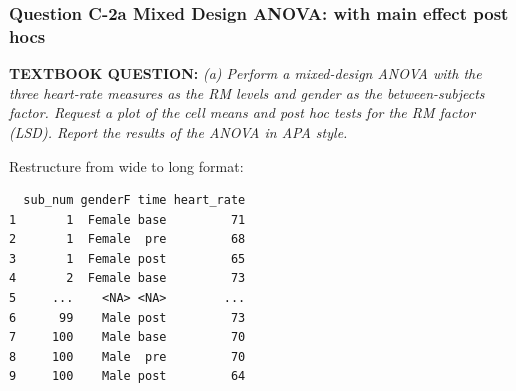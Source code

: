 \documentclass[
]{article}
\newenvironment{Shaded}{\begin{snugshade}}{\end{snugshade}}
\newcommand{\DataTypeTok}[1]{\textcolor[rgb]{0.13,0.29,0.53}{#1}}
\newcommand{\KeywordTok}[1]{\textcolor[rgb]{0.13,0.29,0.53}{\textbf{#1}}}
\newcommand{\NormalTok}[1]{#1}
\newcommand{\OperatorTok}[1]{\textcolor[rgb]{0.81,0.36,0.00}{\textbf{#1}}}
\newcommand{\StringTok}[1]{\textcolor[rgb]{0.31,0.60,0.02}{#1}}
\begin{document}
\hypertarget{question-c-2a-mixed-design-anova-with-main-effect-post-hocs}{%
\subsubsection{Question C-2a Mixed Design ANOVA: with main effect post
hocs}\label{question-c-2a-mixed-design-anova-with-main-effect-post-hocs}}

\textbf{TEXTBOOK QUESTION:} \emph{(a) Perform a mixed-design ANOVA with
the three heart-rate measures as the RM levels and gender as the
between-subjects factor. Request a plot of the cell means and post hoc
tests for the RM factor (LSD). Report the results of the ANOVA in APA
style.}

Restructure from wide to long format:

\begin{Shaded}
\end{Shaded}

\begin{Shaded}
\end{Shaded}

\begin{verbatim}
  sub_num genderF time heart_rate
1       1  Female base         71
2       1  Female  pre         68
3       1  Female post         65
4       2  Female base         73
5     ...    <NA> <NA>        ...
6      99    Male post         73
7     100    Male base         70
8     100    Male  pre         70
9     100    Male post         64
\end{verbatim}
\end{document}
